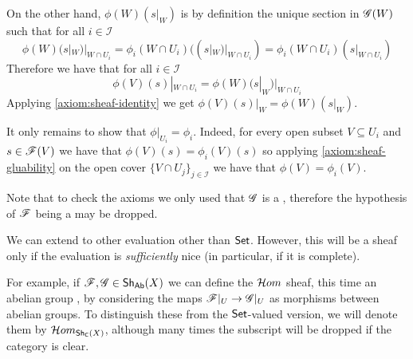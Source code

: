 \documentclass[../main.tex]{subfiles}
\begin{document}
\begin{remark}
\begin{itemize}
          On the other hand, \(\phi(W)(s|_{W})\) is by definition the unique section in \(\mathscr{G}(W)\) such that for all \(i \in \mathcal{I}\)
          \begin{equation*}
            \phi(W)(s|_{W})|_{W \cap U_{i}} = \phi_{i}(W \cap U_{i})((s|_{W})|_{W \cap U_{i}}) = \phi_{i}(W \cap U_{i})(s|_{W \cap U_{i}})
          \end{equation*}
          Therefore we have that for all \(i \in \mathcal{I}\)
          \begin{equation*}
            \phi(V)(s)|_{W \cap U_{i}} = \phi(W)(s|_{W})|_{W \cap U_{i}}
          \end{equation*}
          Applying \ref{axiom:sheaf-identity} we get \(\phi(V)(s)|_{W} = \phi(W)(s|_{W})\).

          It only remains to show that \(\phi|_{U_{i}} = \phi_{i}\).
          Indeed, for every open subset \(V \subseteq U_{i}\) and \(s \in \mathscr{F}(V)\) we have that \(\phi(V)(s) = \phi_{i}(V)(s)\) so applying \ref{axiom:sheaf-gluability} on the open cover \(\{V \cap U_{j}\}_{j \in \mathcal{I}}\) we have that \(\phi(V) = \phi_{i}(V)\).
  \end{itemize}

  Note that to check the  axioms we only used that \(\mathscr{G}\) is a , therefore the hypothesis of \(\mathscr{F}\) being a  may be dropped.
\end{remark}

\begin{remark}
  We can extend  to other evaluation  other than \(\mathsf{Set}\).
  However, this will be a sheaf only if the evaluation  is \textit{sufficiently} nice (in particular, if it is complete).

  For example, if \(\mathscr{F}, \mathscr{G} \in \mathsf{Sh}_{\mathsf{Ab}}(X)\) we can define the \(\mathcal{H}om\) sheaf, this time an abelian group , by considering the maps \(\mathscr{F}|_{U} \to \mathscr{G}|_{U}\) as morphisms between abelian groups.
  To distinguish these  from the \(\mathsf{Set}\)-valued version, we will denote them by \(\mathcal{H}om_{\mathsf{Sh}_{\mathsf{C}}(X)}\), although many times the subscript will be dropped if the category is clear.
\end{remark}
\end{document}
